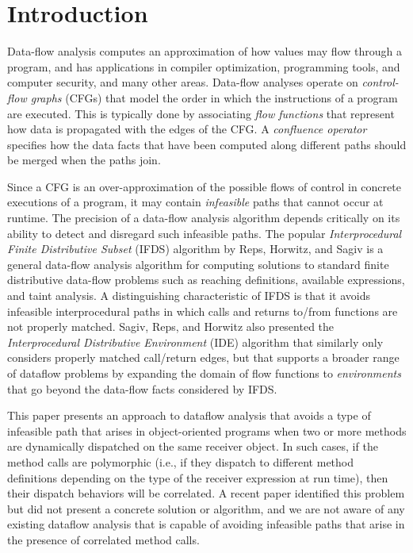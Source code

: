 \section{Introduction}

Data-flow analysis computes an approximation of how values may flow  
through a program, and has applications in compiler optimization, 
programming tools, and computer security, and many other areas.
Data-flow analyses operate on \textit{control-flow graphs} (CFGs)
that model 
the order in which the instructions of a program are executed. This is
typically done by associating \textit{flow functions} that represent how 
data is propagated with the edges of the CFG.  A 
\textit{confluence operator} specifies how the data facts that have been 
computed along different paths should be merged when the paths join.

Since a CFG is an over-approximation of the possible flows 
of control in concrete executions of a program, it may contain \textit{infeasible} 
paths that cannot occur at runtime. The precision of a data-flow analysis algorithm
depends critically on its ability to detect and disregard such infeasible paths.
The popular \textit{Interprocedural Finite Distributive Subset} (IFDS) algorithm 
by  Reps, Horwitz, and Sagiv \cite{reps1995precise} is a general data-flow analysis
algorithm for computing solutions to standard finite distributive data-flow problems such 
as reaching definitions, available expressions, and taint analysis.
A distinguishing 
characteristic of IFDS is that it avoids infeasible interprocedural paths in which calls 
and returns to/from functions are not properly matched. Sagiv, Reps, and Horwitz
also presented the \textit{Interprocedural Distributive Environment} (IDE) algorithm
\cite{sagiv1996precise} that similarly only considers properly matched call/return
edges, but that supports a broader range of dataflow problems by expanding the 
domain of flow functions to \textit{environments} that go beyond the data-flow facts 
considered by IFDS.

This paper presents an approach to dataflow analysis that avoids a type
of infeasible path that arises in object-oriented programs when two or more
methods are dynamically dispatched on the same receiver object. In such cases, if the
method calls are polymorphic (i.e., if they dispatch to different method definitions 
depending on the type of the receiver expression at run time), then their dispatch 
behaviors will be correlated. A recent paper \cite{DBLP:journals/scp/Tip15} identified
this problem but did not present a concrete solution or algorithm, and we are not aware 
of any existing dataflow analysis that is capable of avoiding infeasible paths that arise 
in the presence of correlated method calls.

